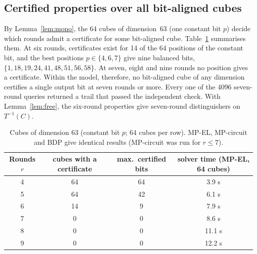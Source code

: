 \documentclass[pdflatex,sn-mathphys-num]{sn-jnl}
\theoremstyle{thmstyleone}
\theoremstyle{thmstylethree}
\theoremstyle{thmstyletwo}
\newcommand{\MPEL}{\textsf{MP-EL}}
\newcommand{\MPC}{\textsf{MP-circuit}}
\newcommand{\BDP}{\textsf{BDP}}
\begin{document}
\subsection{Certified properties over all bit-aligned cubes}
By Lemma~\ref{lem:mono}, the 64 cubes of dimension~63 (one constant bit $p$) decide which rounds admit a certificate for some bit-aligned cube. Table~\ref{tab:maximal} summarises them. At six rounds, certificates exist for 14 of the 64 positions of the constant bit, and the best positions $p\in\{4,6,7\}$ give nine balanced bits, $\{1,18,19,24,41,48,51,56,58\}$. At seven, eight and nine rounds no position gives a certificate. Within the model, therefore, no bit-aligned cube of any dimension certifies a single output bit at seven rounds or more. Every one of the 4096 seven-round queries returned a trail that passed the independent check. With Lemma~\ref{lem:free}, the six-round properties give seven-round distinguishers on $T^{-1}(C)$.

\begin{table}[t]\centering
\caption{Cubes of dimension 63 (constant bit $p$; 64 cubes per row). \MPEL, \MPC{} and \BDP{} give identical results (\MPC{} was run for $r\le7$).}\label{tab:maximal}
\begin{tabular}{cccc}
\toprule
Rounds $r$ & cubes with a certificate & max.\ certified bits & solver time (\MPEL, 64 cubes) \\
\midrule
4 & 64 & 64 & 3.9 s\\
5 & 64 & 42 & 6.1 s\\
6 & 14 & 9  & 7.9 s\\
7 & 0  & 0  & 8.6 s\\
8 & 0  & 0  & 11.1 s\\
9 & 0  & 0  & 12.2 s\\
\bottomrule
\end{tabular}
\end{table}
\end{document}
